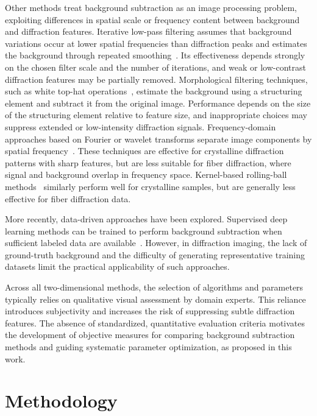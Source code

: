 \documentclass[iucr]{iucrjournals}
\begin{document}
Other methods treat background subtraction as an image processing problem, exploiting differences in spatial scale or frequency content between background and diffraction features. Iterative low-pass filtering assumes that background variations occur at lower spatial frequencies than diffraction peaks and estimates the background through repeated smoothing~\cite{IvanovaMakowski1998}. Its effectiveness depends strongly on the chosen filter scale and the number of iterations, and weak or low-contrast diffraction features may be partially removed. Morphological filtering techniques, such as white top-hat operations~\cite{GonzalezWoodsDIP4e}, estimate the background using a structuring element and subtract it from the original image. Performance depends on the size of the structuring element relative to feature size, and inappropriate choices may suppress extended or low-intensity diffraction signals. Frequency-domain approaches based on Fourier or wavelet transforms separate image components by spatial frequency~\cite{PolarBackground2024, WaveletBiomedOptExpress2021}. These techniques are effective for crystalline diffraction patterns with sharp features, but are less suitable for fiber diffraction, where signal and background overlap in frequency space. Kernel-based rolling-ball methods~\cite{Sternberg1983} similarly perform well for crystalline samples, but are generally less effective for fiber diffraction data.

More recently, data-driven approaches have been explored. Supervised deep learning methods can be trained to perform background subtraction when sufficient labeled data are available~\cite{ArangurenCarmona2020}. However, in diffraction imaging, the lack of ground-truth background and the difficulty of generating representative training datasets limit the practical applicability of such approaches.

Across all two-dimensional methods, the selection of algorithms and parameters typically relies on qualitative visual assessment by domain experts. This reliance introduces subjectivity and increases the risk of suppressing subtle diffraction features. The absence of standardized, quantitative evaluation criteria motivates the development of objective measures for comparing background subtraction methods and guiding systematic parameter optimization, as proposed in this work.




\section{Methodology}
\end{document}
